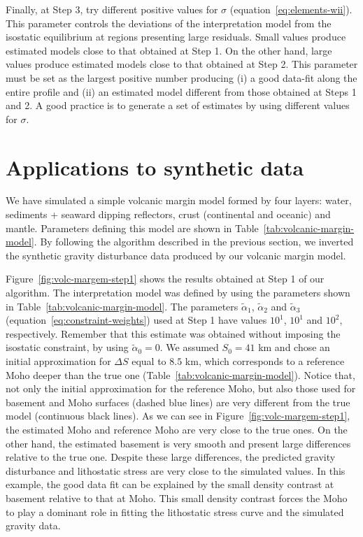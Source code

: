 \documentclass[manuscript]{geophysics}
\begin{document}
Finally, at Step 3, try different positive values for $\sigma$ (equation~\ref{eq:elements-wii}).
This parameter controls the deviations of the interpretation model from the
isostatic equilibrium at regions presenting large residuals.
Small values produce estimated models close to that obtained at Step 1.
On the other hand, large values produce estimated models close to that
obtained at Step 2.
This parameter must be set as the largest positive number producing (i) a good data-fit
along the entire profile and (ii) an estimated model different from those obtained
at Steps 1 and 2.
A good practice is to generate a set of estimates by using different values for $\sigma$. 


\section{Applications to synthetic data}


We have simulated a simple volcanic margin model formed by four layers: 
water, sediments + seaward dipping reflectors, crust (continental and oceanic) 
and mantle. 
Parameters defining this model are shown in Table~\ref{tab:volcanic-margin-model}.
By following the algorithm described in the previous section, we inverted the synthetic 
gravity disturbance data produced by our volcanic margin model.

Figure~\ref{fig:volc-margem-step1} shows the results obtained at Step 1 of our
algorithm.
The interpretation model was defined by using the parameters shown in
Table~\ref{tab:volcanic-margin-model}.
The parameters $\tilde{\alpha}_{1}$, $\tilde{\alpha}_{2}$ and 
$\tilde{\alpha}_{3}$ (equation~\ref{eq:constraint-weights}) used at Step 1 
have values $10^{1}$, $10^{1}$ and $10^{2}$, respectively.
Remember that this estimate was obtained without imposing the 
isostatic constraint, by using $\tilde{\alpha}_{0} = 0$.
We assumed $S_{0} = 41$ km and chose an initial approximation for $\Delta S$
equal to $8.5$ km, which corresponds to a reference Moho deeper 
than the true one (Table~\ref{tab:volcanic-margin-model}).
Notice that, not only the initial approximation for the reference Moho,
but also those used for basement and Moho surfaces 
(dashed blue lines) are very different from
the true model (continuous black lines).
As we can see in Figure~\ref{fig:volc-margem-step1}, the estimated Moho and reference 
Moho are very close to the true ones.
On the other hand, the estimated basement is very smooth and present large differences
relative to the true one.
Despite these large differences, 
the predicted gravity disturbance and lithostatic stress 
are very close to the simulated values.
In this example, the good data fit can be explained by the small density contrast at basement
relative to that at Moho.
This small density contrast forces the Moho to play a dominant role in fitting the
lithostatic stress curve and the simulated gravity data.
\end{document}
